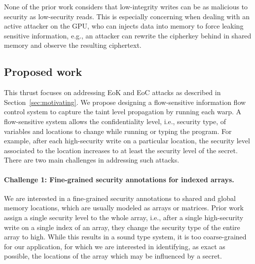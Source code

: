 
None of the prior work considers that low-integrity writes can be as malicious to security as low-security reads.
%
This is especially concerning when dealing with an active attacker on the GPU, who can injects data into memory to force leaking sensitive information,  e.g., an attacker can rewrite the cipherkey behind in shared memory and observe the resulting ciphertext.


\subsection{Proposed work}
This thrust focuses on addressing EoK and EoC attacks as described in Section~\ref{sec:motivating}.
%
%
We propose designing a flow-sensitive information flow control system to capture the taint level propagation by running each warp.
%
A flow-sensitive system allows the confidentiality level,
i.e., security type, of variables and locations to change while running or typing the program. 
%
For example, after each high-security write on a particular location, the security level associated to the location increases to at least the security level of the secret.
%
There are two main challenges in addressing such attacks.


\paragraph{Challenge 1: Fine-grained security annotations for indexed arrays.}
%
We are interested in a fine-grained security annotations to shared and global memory locations, which are usually modeled as arrays or matrices.
%
Prior work~\cite{?} assign a single security level to the whole array, i.e., after a single high-security write on a single index of an array, they change the security type of the entire array to high.
%
While this results in a sound type system, it is too coarse-grained for our application, for which we are interested in identifying, as exact as possible, the locations of the array which may be influenced by a secret. 


